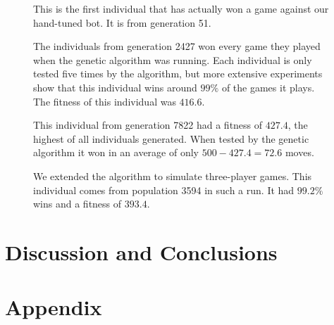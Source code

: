 \documentclass[a4paper,11pt]{article}
\begin{document}
\begin{figure}
\centering

\caption{This is the first individual that has actually won a game
  against our hand-tuned bot. It is from generation 51.}
\label{genpop51}
\end{figure}

\begin{figure}
\centering

\caption{The individuals from generation 2427 won every game they
  played when the genetic algorithm was running. Each individual is
  only tested five times by the algorithm, but more extensive
  experiments show that this individual wins around $99\%$ of the
  games it plays. The fitness of this individual was $416.6$.}
\label{genpop2427}
\end{figure}

\begin{figure}
\centering

\caption{This individual from generation 7822 had a fitness of
  $427.4$, the highest of all individuals generated. When tested by
  the genetic algorithm it won in an average of only $500-427.4=72.6$
  moves.}
\label{genpop7822}
\end{figure}

\begin{figure}
\centering

\caption{We extended the algorithm to simulate three-player games.
  This individual comes from population 3594 in such a run. It had
  $99.2\%$ wins and a fitness of $393.4$.}
\label{gen3pop3594}
\end{figure}

\section{Discussion and Conclusions}





\section{Appendix}



\end{document}
